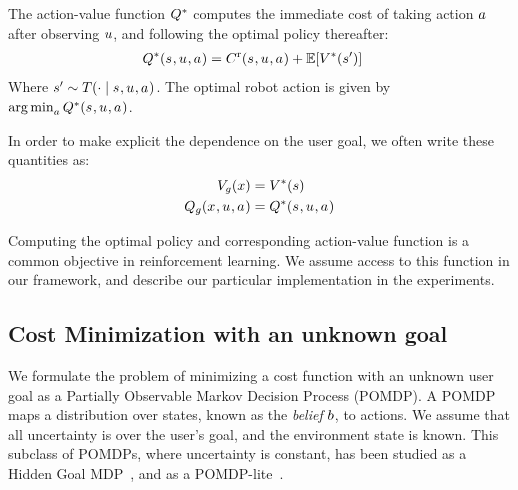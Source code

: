 The action-value function $Q^{*}$ computes the immediate cost of taking action $a$ after observing $u$, and following the optimal policy thereafter:
\begin{align*}
  Q^{*}(s_{ }, u_{ }, a_{ }) &= C^{\text{r}}(s_{ }, u_{ }, a_{ }) + \mathbb{E}\!\left[V^{*}(s')\right]
\end{align*}
Where $s' \sim T(\cdot \mid s_{ }, u_{ }, a_{ })$. The optimal robot action is given by $\operatorname*{arg\,min}_a Q^{*}(s_{ }, u_{ }, a_{ })$.

In order to make explicit the dependence on the user goal, we often write these quantities as:
\begin{align*}
  V_{g}(x) &= V^{*}(s)\\
  Q_{g}(x_{ }, u_{ }, a_{ }) &= Q^{*}(s_{ }, u_{ }, a_{ })
\end{align*}

Computing the optimal policy and corresponding action-value function is a common objective in reinforcement learning. We assume access to this function in our framework, and describe our particular implementation in the experiments.

%


\subsection{Cost Minimization with an unknown goal}
\label{sec:framework_unknown_goal}

We formulate the problem of minimizing a cost function with an unknown user goal as a Partially Observable Markov Decision Process (POMDP). A POMDP maps a distribution over states, known as the \emph{belief} $b$, to actions. We assume that all uncertainty is over the user's goal, and the environment state is known. This subclass of POMDPs, where uncertainty is constant, has been studied as a Hidden Goal MDP~\citep{fern_2010}, and as a POMDP-lite~\citep{chen_2016}.

